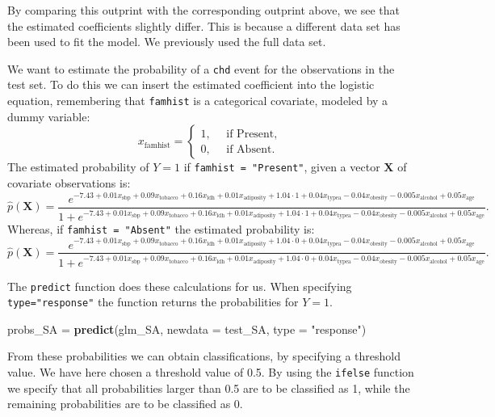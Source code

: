 \documentclass[10pt,ignorenonframetext,]{beamer}
\newenvironment{Shaded}{\begin{snugshade}}{\end{snugshade}}
\newcommand{\KeywordTok}[1]{\textcolor[rgb]{0.13,0.29,0.53}{\textbf{#1}}}
\newcommand{\DataTypeTok}[1]{\textcolor[rgb]{0.13,0.29,0.53}{#1}}
\newcommand{\StringTok}[1]{\textcolor[rgb]{0.31,0.60,0.02}{#1}}
\newcommand{\NormalTok}[1]{#1}
\begin{document}
\begin{frame}[fragile]

By comparing this outprint with the corresponding outprint above, we see
that the estimated coefficients slightly differ. This is because a
different data set has been used to fit the model. We previously used
the full data set.

We want to estimate the probability of a \texttt{chd} event for the
observations in the test set. To do this we can insert the estimated
coefficient into the logistic equation, remembering that
\texttt{famhist} is a categorical covariate, modeled by a dummy
variable:
\[x_\text{famhist} = \begin{cases} 1, \quad \text{ if Present}, \\ 0, \quad \text{ if Absent}.\end{cases}\]
The estimated probability of \(Y=1\) if \texttt{famhist\ =\ "Present"},
given a vector \(\mathbf{X}\) of covariate observations is:
\[\hat{p}(\mathbf{X}) =\frac{e^{-7.43 + 0.01 x_{\text{sbp}} + 0.09 x_{\text{tobacco}} + 0.16 x_\text{ldh} + 0.01 x_\text{adiposity}+1.04 \cdot 1 + 0.04 x_\text{typea}-0.04 x_\text{obesity}-0.005 x_\text{alcohol} +0.05 x_{\text{age}}}}{1+e^{-7.43 + 0.01 x_{\text{sbp}} + 0.09 x_{\text{tobacco}} + 0.16 x_\text{ldh} + 0.01 x_\text{adiposity}+1.04 \cdot 1 + 0.04 x_\text{typea}-0.04 x_\text{obesity}-0.005 x_\text{alcohol} +0.05 x_{\text{age}}}} .\]
Whereas, if \texttt{famhist\ =\ "Absent"} the estimated probability is:
\[\hat{p}(\mathbf{X}) =\frac{e^{-7.43 + 0.01 x_{\text{sbp}} + 0.09 x_{\text{tobacco}} + 0.16 x_\text{ldh} + 0.01 x_\text{adiposity}+1.04 \cdot 0 + 0.04 x_\text{typea}-0.04 x_\text{obesity}-0.005 x_\text{alcohol} +0.05 x_{\text{age}}}}{1+e^{-7.43 + 0.01 x_{\text{sbp}} + 0.09 x_{\text{tobacco}} + 0.16 x_\text{ldh} + 0.01 x_\text{adiposity}+1.04 \cdot 0 + 0.04 x_\text{typea}-0.04 x_\text{obesity}-0.005 x_\text{alcohol} +0.05 x_{\text{age}}}} .\]

\end{frame}

\begin{frame}[fragile]

The \texttt{predict} function does these calculations for us. When
specifying \texttt{type="response"} the function returns the
probabilities for \(Y=1\).

\begin{Shaded}
\begin{Highlighting}[]
\NormalTok{probs_SA =}\StringTok{ }\KeywordTok{predict}\NormalTok{(glm_SA, }\DataTypeTok{newdata =}\NormalTok{ test_SA, }\DataTypeTok{type =} \StringTok{"response"}\NormalTok{)}
\end{Highlighting}
\end{Shaded}

From these probabilities we can obtain classifications, by specifying a
threshold value. We have here chosen a threshold value of 0.5. By using
the \texttt{ifelse} function we specify that all probabilities larger
than 0.5 are to be classified as 1, while the remaining probabilities
are to be classified as 0.

\end{frame}
\end{document}
